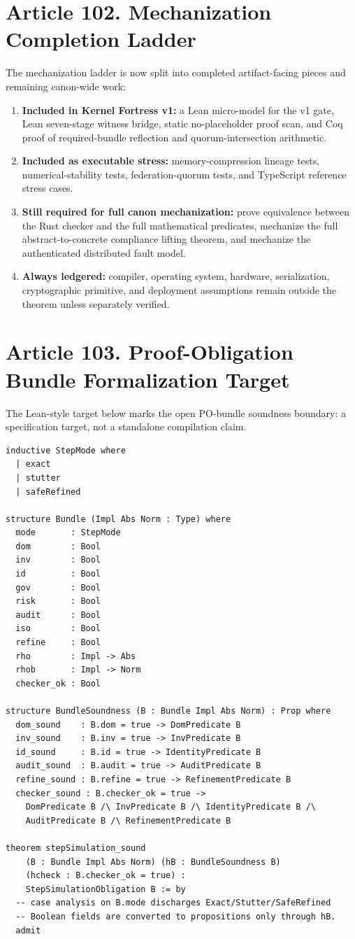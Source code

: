 \documentclass[10pt,oneside]{article}
\theoremstyle{definition}
\theoremstyle{remark}
\begin{document}
\section{Article 102. Mechanization Completion Ladder}
The mechanization ladder is now split into completed artifact-facing pieces and remaining canon-wide work:
\begin{enumerate}
  \item \textbf{Included in Kernel Fortress v1:} a Lean micro-model for the v1 gate, Lean seven-stage witness bridge, static no-placeholder proof scan, and Coq proof of required-bundle reflection and quorum-intersection arithmetic.
  \item \textbf{Included as executable stress:} memory-compression lineage tests, numerical-stability tests, federation-quorum tests, and TypeScript reference stress cases.
  \item \textbf{Still required for full canon mechanization:} prove equivalence between the Rust checker and the full mathematical predicates, mechanize the full abstract-to-concrete compliance lifting theorem, and mechanize the authenticated distributed fault model.
  \item \textbf{Always ledgered:} compiler, operating system, hardware, serialization, cryptographic primitive, and deployment assumptions remain outside the theorem unless separately verified.
\end{enumerate}

\section{Article 103. Proof-Obligation Bundle Formalization Target}
The Lean-style target below marks the open PO-bundle soundness boundary: a specification target, not a standalone compilation claim.

\begin{lstlisting}[language={},caption={Lean-style proof-obligation bundle target.}]
inductive StepMode where
  | exact
  | stutter
  | safeRefined

structure Bundle (Impl Abs Norm : Type) where
  mode       : StepMode
  dom        : Bool
  inv        : Bool
  id         : Bool
  gov        : Bool
  risk       : Bool
  audit      : Bool
  iso        : Bool
  refine     : Bool
  rho        : Impl -> Abs
  rhob       : Impl -> Norm
  checker_ok : Bool

structure BundleSoundness (B : Bundle Impl Abs Norm) : Prop where
  dom_sound    : B.dom = true -> DomPredicate B
  inv_sound    : B.inv = true -> InvPredicate B
  id_sound     : B.id = true -> IdentityPredicate B
  audit_sound  : B.audit = true -> AuditPredicate B
  refine_sound : B.refine = true -> RefinementPredicate B
  checker_sound : B.checker_ok = true ->
    DomPredicate B /\ InvPredicate B /\ IdentityPredicate B /\
    AuditPredicate B /\ RefinementPredicate B

theorem stepSimulation_sound
    (B : Bundle Impl Abs Norm) (hB : BundleSoundness B)
    (hcheck : B.checker_ok = true) :
    StepSimulationObligation B := by
  -- case analysis on B.mode discharges Exact/Stutter/SafeRefined
  -- Boolean fields are converted to propositions only through hB.
  admit
\end{lstlisting}
\end{document}
